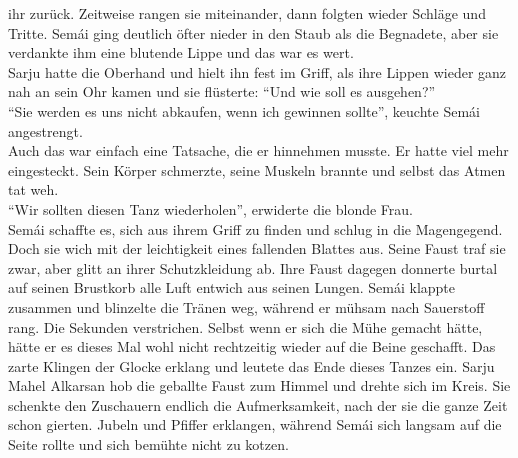 ihr zurück. Zeitweise rangen sie miteinander, dann folgten wieder Schläge und Tritte. Semái ging 
deutlich öfter nieder in den Staub als die Begnadete, aber sie verdankte ihm eine blutende Lippe 
und das war es wert. \\
Sarju hatte die Oberhand und hielt ihn fest im Griff, als ihre Lippen wieder ganz nah an sein Ohr 
kamen und sie flüsterte: ``Und wie soll es ausgehen?''\\
``Sie werden es uns nicht abkaufen, wenn ich gewinnen sollte'', keuchte Semái angestrengt.\\
Auch das war einfach eine Tatsache, die er hinnehmen musste. Er hatte viel mehr eingesteckt. Sein 
Körper schmerzte, seine Muskeln brannte und selbst das Atmen tat weh.\\
``Wir sollten diesen Tanz wiederholen'', erwiderte die blonde Frau.\\
Semái schaffte es, sich aus ihrem Griff zu finden und schlug in die Magengegend. Doch sie wich mit 
der leichtigkeit eines fallenden Blattes aus. Seine Faust traf sie zwar, aber glitt an ihrer 
Schutzkleidung ab. Ihre Faust dagegen donnerte burtal auf seinen Brustkorb alle Luft entwich aus 
seinen Lungen. Semái klappte zusammen und blinzelte die Tränen weg, während er mühsam nach 
Sauerstoff rang. Die Sekunden verstrichen. Selbst wenn er sich die Mühe gemacht hätte, hätte er es 
dieses Mal wohl nicht rechtzeitig wieder auf die Beine geschafft. Das zarte Klingen der Glocke 
erklang und leutete das Ende dieses Tanzes ein. Sarju Mahel Alkarsan hob die geballte Faust zum 
Himmel und drehte sich im Kreis. Sie schenkte den Zuschauern endlich die Aufmerksamkeit, nach der 
sie die ganze Zeit schon gierten. Jubeln und Pfiffer erklangen, während Semái sich langsam auf die 
Seite rollte und sich bemühte nicht zu kotzen. \\


